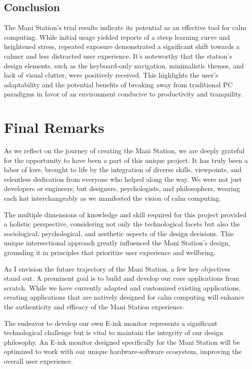 \documentclass[letterpaper,twocolumn,10pt]{article}
\begin{document}
\subsection{Conclusion}
The Mani Station's trial results indicate its potential as an effective tool for calm computing. While initial usage yielded reports of a steep learning curve and heightened stress, repeated exposure demonstrated a significant shift towards a calmer and less distracted user experience. It's noteworthy that the station's design elements, such as the keyboard-only navigation, minimalistic themes, and lack of visual clutter, were positively received. This highlights the user's adaptability and the potential benefits of breaking away from traditional PC paradigms in favor of an environment conducive to productivity and tranquility.
\section{Final Remarks}
As we reflect on the journey of creating the Mani Station, we are deeply grateful for the opportunity to have been a part of this unique project. It has truly been a labor of love, brought to life by the integration of diverse skills, viewpoints, and relentless dedication from everyone who helped along the way. We were not just developers or engineers; but designers, psychologists, and philosophers, wearing each hat interchangeably as we manifested the vision of calm computing.

The multiple dimensions of knowledge and skill required for this project provided a holistic perspective, considering not only the technological facets but also the sociological, psychological, and aesthetic aspects of the design decisions. This unique intersectional approach greatly influenced the Mani Station's design, grounding it in principles that prioritize user experience and wellbeing.

As I envision the future trajectory of the Mani Station, a few key objectives stand out. A prominent goal is to build and develop our core applications from scratch. While we have currently adapted and customized existing applications, creating applications that are natively designed for calm computing will enhance the authenticity and efficacy of the Mani Station experience.

The endeavor to develop our own E-ink monitor represents a significant technological challenge but is vital to maintain the integrity of our design philosophy. An E-ink monitor designed specifically for the Mani Station will be optimized to work with our unique hardware-software ecosystem, improving the overall user experience.
\end{document}
